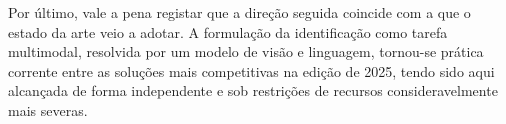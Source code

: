 Por último, vale a pena registar que a direção seguida coincide com a que o estado da arte veio a
adotar. A formulação da identificação como tarefa multimodal, resolvida por um modelo de visão e
linguagem, tornou-se prática corrente entre as soluções mais competitivas na edição de 2025, tendo
sido aqui alcançada de forma independente e sob restrições de recursos consideravelmente mais
severas.
